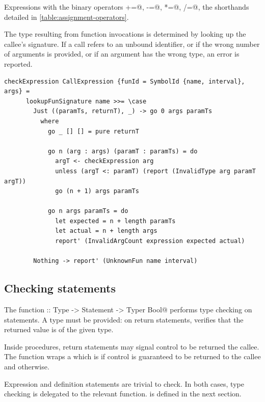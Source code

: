 \documentclass[UdineBachThesis,american,11pt]{PhdThesis}
\begin{document}
  Expressions with the binary operators \lstinline@+=@, \lstinline@-=@,
  \lstinline@*=@, \lstinline@/=@, \lstinline@%=@ are type checked considering
  the shorthands detailed in \autoref{table:assignment-operators}.

  The type resulting from function invocations is determined by looking up the
  callee's signature. If a call refers to an unbound identifier, or if the wrong
  number of arguments is provided, or if an argument has the wrong type, an
  error is reported.

  \begin{lstlisting}[gobble=4,basicstyle=\ttfamily\small]
    checkExpression CallExpression {funId = SymbolId {name, interval}, args} =
      lookupFunSignature name >>= \case
        Just ((paramTs, returnT), _) -> go 0 args paramTs
          where
            go _ [] [] = pure returnT

            go n (arg : args) (paramT : paramTs) = do
              argT <- checkExpression arg
              unless (argT <: paramT) (report (InvalidType arg paramT argT))
              go (n + 1) args paramTs

            go n args paramTs = do
              let expected = n + length paramTs
              let actual = n + length args
              report' (InvalidArgCount expression expected actual)

        Nothing -> report' (UnknownFun name interval)
  \end{lstlisting}

  \subsection{Checking statements}

  The function \lstinline@checkStatement :: Type -> Statement -> Typer Bool@
  performs type \linebreak checking on statements. A type must be provided: on
  return statements, \lstinline@checkStatement@ verifies that the returned value
  is of the given type.

  Inside procedures, return statements may signal control to be returned the
  callee. The function \lstinline@checkStatement@ wraps a \lstinline@Bool@ which
  is \lstinline@True@ if control is guaranteed to be returned to the callee and
  \lstinline@False@ otherwise.

  Expression and definition statements are trivial to check. In both cases, type
  checking is delegated to the relevant function. \lstinline@checkDefinitions@
  is defined in the next section.
\end{document}
